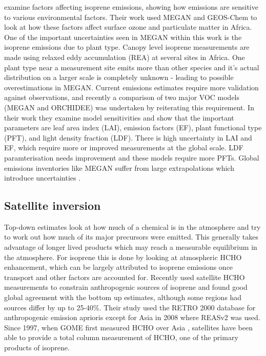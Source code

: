     \cite{Marais2014} examine factors affecting isoprene emissions, showing how emissions are sensitive to various environmental factors.
    Their work used MEGAN \citep{Guenther1995} and GEOS-Chem to look at how these factors affect surface ozone and particulate matter in Africa.
    One of the important uncertainties seen in MEGAN within this work is the isoprene emissions due to plant type.
    Canopy level isoprene measurements are made using relaxed eddy accumulation (REA) at several sites in Africa.
    One plant type near a measurement site emits more than other species and it's actual distribution on a larger scale is completely unknown - leading to possible overestimations in MEGAN.
    Current emissions estimates require more validation against observations, and recently a comparison of two major VOC models (MEGAN and ORCHIDEE) was undertaken by \cite{Messina2016} reiterating this requirement.
    In their work they examine model sensitivities and show that the important parameters are leaf area index (LAI), emission factors (EF), plant functional type (PFT), and light density fraction (LDF).
    There is high uncertainty in LAI and EF, which require more or improved measurements at the global scale.
    LDF paramterisation needs improvement and these models require more PFTs.
    Global emissions inventories like MEGAN suffer from large extrapolations which introduce uncertainties \citep{Miller2014}.
  
  
  
  \subsection{Satellite inversion}
  \label{LR:Models:SatelliteInversion}
  
  Top-down estimates look at how much of a chemical is in the atmosphere and try to work out how much of its major precursors were emitted.
  This generally takes advantage of longer lived products which may reach a measurable equilibrium in the atmosphere.
  For isoprene this is done by looking at atmospheric HCHO enhancement, which can be largely attributed to isoprene emissions once transport and other factors are accounted for.
  Recently \cite{Stavrakou2015} used satellite HCHO measurements to constrain anthropogenic sources of isoprene and found good global agreement with the bottom up estimates, although some regions had sources differ by up to 25-40\%. 
  Their study used the RETRO 2000 database for anthropogenic emission aprioris except for Asia in 2008 where REASv2 was used. 
  Since 1997, when GOME first measured HCHO over Asia \citep{Thomas1998}, satellites have been able to provide a total column measurement of HCHO, one of the primary products of isoprene.
  
